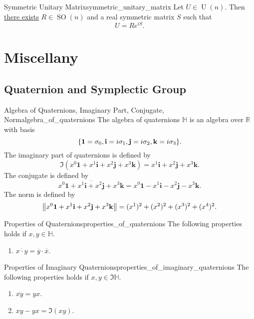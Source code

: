 \documentclass{article}
\begin{document}
\begin{theorem}{Symmetric Unitary Matrix}{symmetric_unitary_matrix}
    Let $U\in \operatorname{U}(n)$. Then \href{https://mathoverflow.net/questions/93774/symmetric-unitary-matrices}{there exists} $R\in\operatorname{SO}(n)$ and a real symmetric matrix $S$ such that 
    \[ U = R e^{iS}. \]
\end{theorem}

\section{Miscellany}

\subsection{Quaternion and Symplectic Group}

\begin{definition}{Algebra of Quaternions, Imaginary Part, Conjugate, Norm}{algebra_of_quaternions}
    The algebra of quaternions $\mathbb{H}$ is an algebra over $\mathbb{R}$ with basis
    \[ \qty{\mathbf{1} = \sigma_0, \mathbf{i} = i \sigma_1, \mathbf{j} = i \sigma_2, \mathbf{k} = i \sigma_3}. \]
    The imaginary part of quaternions is defined by
    \[ \Im(x^0 \mathbf{1} + x^1 \mathbf{i} + x^2 \mathbf{j} + x^3 \mathbf{k}) =  x^1 \mathbf{i} + x^2 \mathbf{j} + x^3 \mathbf{k}. \]
    The conjugate is defined by
    \[ \overline{x^0 \mathbf{1} + x^1 \mathbf{i} + x^2 \mathbf{j} + x^3 \mathbf{k}} =  x^0\mathbf{1} - x^1 \mathbf{i} - x^2 \mathbf{j} - x^3 \mathbf{k}. \]
    The norm is defined by
    \[ \norm{x^0 \mathbf{1} + x^1 \mathbf{i} + x^2 \mathbf{j} + x^3 \mathbf{k}} = (x^1)^2 + (x^2)^2 + (x^3)^2 + (x^4)^2. \]
\end{definition}

\begin{theorem}{Properties of Quaternions}{properties_of_quaternions}
    The following properties holds if $x,y\in\mathbb{H}$.
    \begin{enumerate}
        \item $\overline{x\cdot y} = \overline{y}\cdot \overline{x}$.
    \end{enumerate}
\end{theorem}

\begin{theorem}{Properties of Imaginary Quaternions}{properties_of_imaginary_quaternions}
    The following properties holds if $x,y\in\Im\mathbb{H}$.
    \begin{enumerate}
        \item $\overline{xy} = yx$.
        \item $xy - yx = \Im(xy)$.
    \end{enumerate}
\end{theorem}
\end{document}

